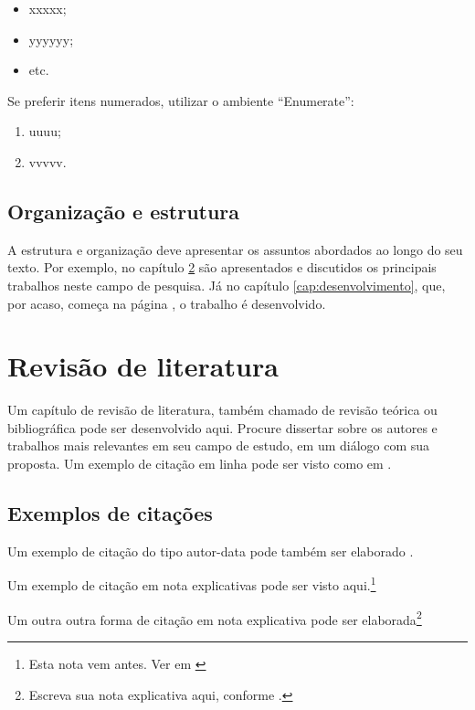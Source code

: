 \documentclass[
	12pt,				%
	openright,			%
	oneside,			%
	a4paper,			%
	english,			%
	brazil				%
	]{abntex2}
\begin{document}
\begin{itemize}
	\item xxxxx;
	\item yyyyyy;
	\item etc.
\end{itemize}

Se preferir itens numerados, utilizar o ambiente ``Enumerate'':
	\begin{enumerate}
	\item uuuu;
	\item vvvvv.
\end{enumerate}
%

\section{Organização e estrutura}

A estrutura e organização deve apresentar os assuntos abordados ao longo do seu texto. Por exemplo, no capítulo \ref{cap:revisao-de-literatura} são apresentados e discutidos os principais trabalhos neste campo de pesquisa. Já no capítulo \ref{cap:desenvolvimento}, que, por acaso, começa na página \pageref{cap:desenvolvimento}, o trabalho é desenvolvido.



\chapter{Revisão de literatura} \label{cap:revisao-de-literatura}

Um capítulo de revisão de literatura, também chamado de revisão teórica ou bibliográfica pode ser desenvolvido aqui. Procure dissertar sobre os autores e trabalhos mais relevantes em seu campo de estudo, em um diálogo com sua proposta. Um exemplo de citação em linha pode ser visto como em \textcite{Einstein1920}. 

\section{Exemplos de citações}

Um exemplo de citação do tipo autor-data pode também ser elaborado \cite{Einstein1920}. 

Um exemplo de citação em nota explicativas pode ser visto aqui.\footnote{Esta nota vem antes. Ver em \textcite[p.~22]{descartes-carta-mersene}} 

Um outra outra forma de citação em nota explicativa pode ser elaborada\footnote{Escreva sua nota explicativa aqui, conforme \cite{boyle1772}.}
\end{document}
